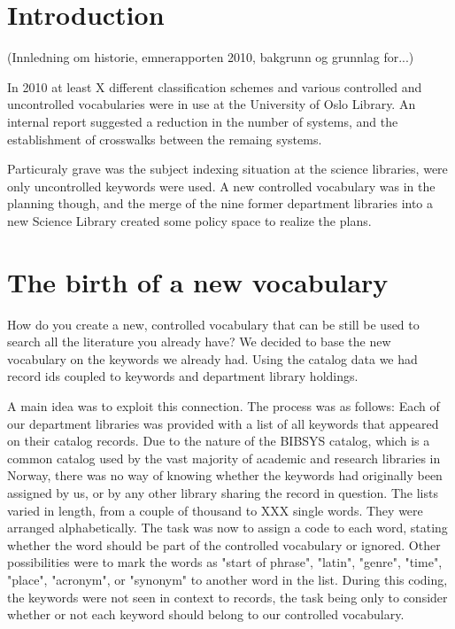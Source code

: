 \section{Introduction}

(Innledning om historie, emnerapporten 2010, bakgrunn og grunnlag for...)

In 2010 at least X different classification schemes and various controlled and uncontrolled vocabularies were in use at the University of Oslo Library. An internal report suggested a reduction in the number of systems, and the establishment of crosswalks between the remaing systems.

Particuraly grave was the subject indexing situation at the science libraries, were only uncontrolled keywords were used. A new controlled vocabulary was in the planning though, and the merge of the nine former department libraries into a new Science Library created some policy space to realize the plans.

\section{The birth of a new vocabulary}

How do you create a new, controlled vocabulary that can be still be used to search all the literature you already have?
We decided to base the new vocabulary on the keywords we already had. Using the catalog data we had record ids coupled to keywords and department library holdings. 

A main idea was to exploit this connection. The process was as follows: Each of our department libraries was provided with a list of all keywords that appeared on their catalog records. Due to the nature of the BIBSYS catalog, which is a common catalog used by the vast majority of academic and research libraries in Norway, there was no way of knowing whether the keywords had originally been assigned by us, or by any other library sharing the record in question. The lists varied in length, from a couple of thousand to XXX single words. They were arranged alphabetically. The task was now to assign a code to each word, stating whether the word should be part of the controlled vocabulary or ignored. Other possibilities were to mark the words as "start of phrase", "latin", "genre", "time", "place", "acronym", or "synonym" to another word in the list. During this coding, the keywords were not seen in context to records, the task being only to consider whether or not each keyword should belong to our controlled vocabulary. 

